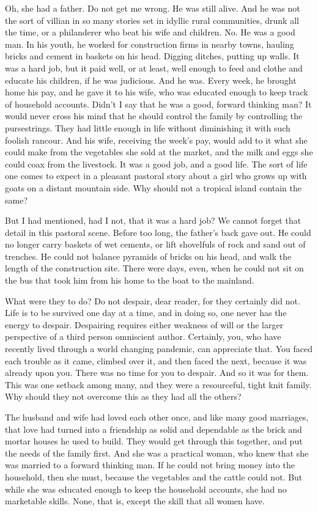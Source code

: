 \documentclass{amsart}
\newcommand{\egnote}{\todo[color=violet!30]}
\begin{document}
Oh, she had a father. Do not get me wrong. He was still alive. And he was not the sort of villian in so many stories set in idyllic rural communities, drunk all the time, or a philanderer who beat his wife and children. No. He was a good man. In his youth, he worked for construction firms in nearby towns, hauling bricks and cement in baskets on his head. Digging ditches, putting up walls. It was a hard job, but it paid well, or at least, well enough to feed and clothe and educate his children, if he was judicious. And he was. Every week, he brought home his pay, and he gave it to his wife, who was educated enough to keep track of household accounts. Didn't I say that he was a good, forward thinking man? It would never cross his mind that he should control the family by controlling the pursestrings. They had little enough in life without diminishing it with such foolish rancour. And his wife, receiving the week's pay, would add to it what she could make from the vegetables she sold at the market, and the milk  and eggs she could coax from the livestock. It was a good job, and a good life. The sort of life one comes to expect in a pleasant pastoral story about a girl who grows up with goats on a distant mountain side. Why should not a tropical island contain the same?

But I had mentioned, had I not, that it was a hard job? We cannot forget that detail in this pastoral scene. Before too long, the father's back gave out. He could no longer carry baskets of wet cements\egnote{singular}, or lift shovelfuls of rock and sand out of trenches. He could not balance pyramids of bricks on his head, and walk the length of the construction site. There were days, even, when he could not sit on the bus that took him from his home to the boat to the mainland.

What were they to do? Do not despair, dear reader, for they certainly did not. Life is to be survived one day at a time, and in doing so, one never has the energy to despair. Despairing requires either weakness of will or the larger perspective of a third person omniscient author. Certainly, you, who have recently lived through a world changing pandemic, can appreciate that. You faced each trouble as it came, climbed over it, and then faced the next, because it was already upon you. There was no time for you to despair. And so it was for them. This was one setback among many, and they were a resourceful, tight knit family. Why should they not overcome this as they had all the others?

The husband and wife had loved each other once, and like many good marriages, that love had turned into a friendship as solid and dependable as the brick and mortar houses he used to build. They would get through this together, and put the needs of the family first. And she was a practical woman, who knew that she was married to a forward thinking man. If he could not bring money into the household, then she must, because the vegetables and the cattle could not. But while she was educated enough to keep the household accounts, she had no marketable skills. None, that is, except the skill that all women have. 
\end{document}
